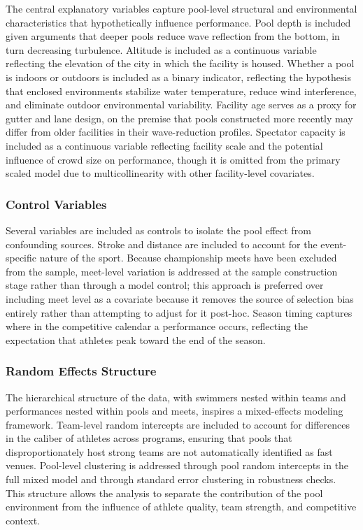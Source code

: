\documentclass[12pt]{article}
\begin{document}
The central explanatory variables capture pool-level structural and
environmental characteristics that hypothetically influence performance. Pool
depth is included given arguments that deeper pools reduce wave reflection from
the bottom, in turn decreasing turbulence. Altitude is included as a continuous
variable reflecting the elevation of the city in which the facility is housed.
Whether a pool is indoors or outdoors is included as a binary indicator,
reflecting the hypothesis that enclosed environments stabilize water temperature,
reduce wind interference, and eliminate outdoor environmental variability.
Facility age serves as a proxy for gutter and lane design, on the premise that
pools constructed more recently may differ from older facilities in their
wave-reduction profiles. Spectator capacity is included as a continuous variable
reflecting facility scale and the potential influence of crowd size on
performance, though it is omitted from the primary scaled model due to
multicollinearity with other facility-level covariates.

\subsubsection{Control Variables}

Several variables are included as controls to isolate the pool effect from
confounding sources. Stroke and distance are included to account for the
event-specific nature of the sport. Because championship meets have been
excluded from the sample, meet-level variation is addressed at the sample
construction stage rather than through a model control; this approach is
preferred over including meet level as a covariate because it removes the
source of selection bias entirely rather than attempting to adjust for it
post-hoc. Season timing captures where in the competitive calendar a
performance occurs, reflecting the expectation that athletes peak toward the
end of the season.

\subsubsection{Random Effects Structure}

The hierarchical structure of the data, with swimmers nested within teams and
performances nested within pools and meets, inspires a mixed-effects modeling
framework. Team-level random intercepts are included to account for differences
in the caliber of athletes across programs, ensuring that pools that
disproportionately host strong teams are not automatically identified as fast
venues. Pool-level clustering is addressed through pool random intercepts in the
full mixed model and through standard error clustering in robustness checks.
This structure allows the analysis to separate the contribution of the pool
environment from the influence of athlete quality, team strength, and
competitive context.
\end{document}
